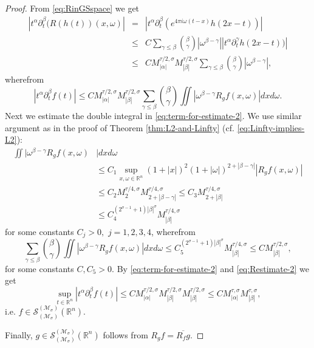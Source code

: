 \documentclass{article}
\theoremstyle{thmstyleone}
\theoremstyle{thmstyletwo}%
\theoremstyle{thmstylethree}%
\begin{document}
\begin{proof}
From \eqref{eq:RinGSspace} we get
\begin{eqnarray}
 | t^\alpha \partial^\beta _t (R (h (t)) (x, \omega) |
&  = &
| t^\alpha \partial^\beta _t  ( e^{4\pi i \omega (t-x)} h(2x-t))|
\nonumber \\
&  \leq &
C \sum_{\gamma \leq \beta} \binom{\beta}{\gamma}
|\omega^{\beta - \gamma} |
 | t^{\alpha}  \partial^\gamma _t h(2x-t))| 
 \nonumber \\
&  \leq &
C M^{\tau/2, \sigma} _{|\alpha|} M^{\tau/2, \sigma} _{|\beta|} 
\sum_{\gamma \leq \beta} \binom{\beta}{\gamma}
|\omega^{\beta - \gamma} |, 
\nonumber
\end{eqnarray}
wherefrom
\begin{equation} \label{eq:term-for-estimate-2}
|t^\alpha \partial^\beta _t f (t) |
\leq C
M^{\tau/2, \sigma} _{|\alpha|} M^{\tau/2, \sigma} _{|\beta|} 
\sum_{\gamma \leq \beta} \binom{\beta}{\gamma}
\iint |\omega^{\beta - \gamma}  R_{g} f (x, \omega)|
dx d\omega.
\end{equation}
Next we estimate the double integral in \eqref{eq:term-for-estimate-2}. We use  similar argument as in the proof of Theorem \ref{thm:L2-and-Linfty} (cf. \eqref{eq:Linfty-implies-L2}):
\begin{align}
\iint |\omega^{\beta - \gamma}  R_{g} f (x, \omega) & |
 dx d\omega \nonumber \\
  & \leq 
C_1 \sup_{x,\omega \in \mathbb R^{n}} (1+|x|)^2
(1+|\omega|)^{2+|\beta - \gamma|} |R_{g} f (x, \omega)|
\nonumber \\
  & \leq 
C_2    M^{\tau/4, \sigma} _{2} M^{\tau/4, \sigma} _{2+|\beta -\gamma|}  \leq C_3 M^{\tau/4, \sigma} _{2+|\beta|} 
\nonumber \\
  & \leq 
C_4 ^{(2^{\sigma - 1} +1) |\beta|^\sigma} 
 M^{\tau/4, \sigma} _{|\beta|} 
 \nonumber
\end{align}
for some constants $ C_j >0,$ $ j =1,2,3,4$, wherefrom
\begin{equation}
\sum_{\gamma \leq \beta} \binom{\beta}{\gamma}
\iint |\omega^{\beta - \gamma}  R_{g} f (x, \omega)|
dx d\omega
\leq 
C_5 ^{(2^{\sigma - 1} +1) |\beta|^\sigma} 
M^{\tau/4, \sigma} _{|\beta|} 
\leq
 C M^{\tau/2, \sigma} _{|\beta|},
  \label{eq:Restimate-2}
\end{equation}
for some constants $C, C_5 > 0$.
By \eqref{eq:term-for-estimate-2} and 
\eqref{eq:Restimate-2} we get
$$
\sup_{t \in \mathbb R^{n}}
|t^\alpha \partial^\beta _t f (t) | \leq
C 
M^{\tau/2, \sigma} _{|\alpha|} M^{\tau/2, \sigma} _{|\beta|}  M^{\tau/2, \sigma} _{|\beta|}
\leq
C 
M^{\tau, \sigma} _{|\alpha|} M^{\tau, \sigma} _{|\beta|},  
$$
i.e. $ f \in \mathcal S_{(\mathcal{M}_\sigma )}^{(\mathcal{M}_\sigma)} (\mathbb R^{n}) $.

Finally, $ g \in \mathcal S_{(\mathcal{M}_\sigma )}^{(\mathcal{M}_\sigma)} (\mathbb R^{n}) $
follows from 
$  R_g f = \overline{R_f g}$.
\end{proof}
\end{document}
